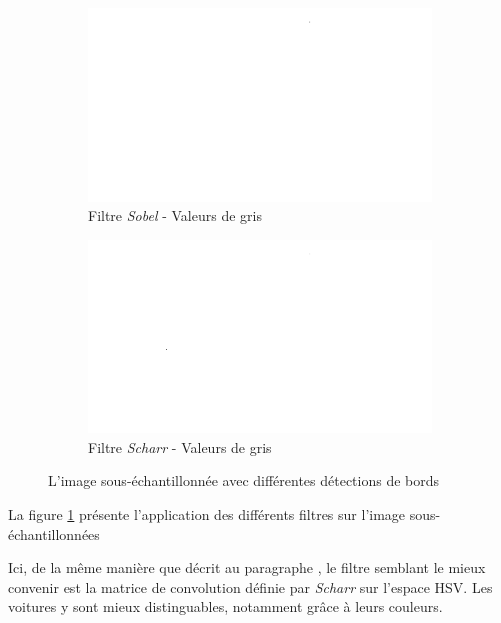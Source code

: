 \begin{figure}[H]
    \bigskip
    \begin{subfigure}{.5\textwidth}
        \centering
        \includegraphics[width=.85\linewidth]{img/conception/image_process/downsample-edge/2.png}
        \caption{Filtre \textit{Sobel} - Valeurs de gris}
    \end{subfigure}%
    \begin{subfigure}{.5\textwidth}
        \centering
        \includegraphics[width=.85\linewidth]{img/conception/image_process/downsample-edge/5.png}
        \caption{Filtre \textit{Scharr} - Valeurs de gris}
    \end{subfigure}%
    \centering
    \caption{L'image sous-échantillonnée avec différentes détections de bords}
    \label{fig:image_process_down_edge}
\end{figure}

La figure \ref{fig:image_process_down_edge} présente l'application des différents filtres sur l'image sous-échantillonnées

Ici, de la même manière que décrit au paragraphe , le filtre semblant le mieux convenir est la matrice de convolution définie par \textit{Scharr} sur l'espace HSV. Les voitures y sont mieux distinguables, notamment grâce à leurs couleurs.

